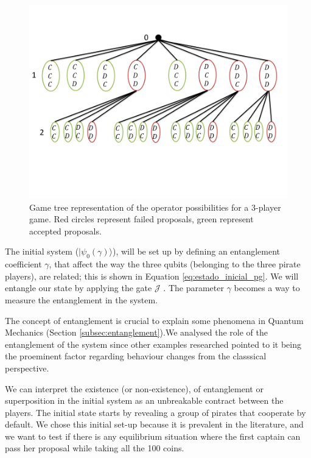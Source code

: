 \begin{figure}[h]
\centering 
\includegraphics[scale=0.55]{Figures/architecture/GameTree/Slide1.png}
\caption{Game tree representation of the operator possibilities for a $3$-player game. Red circles represent failed proposals, green represent accepted proposals. }
\label{fig:pg_architecturegametree}
\end{figure}

The initial system ($\vert \psi_{0}(\gamma) \rangle$), will be set up by defining an entanglement coefficient $\gamma$, that affect the way the three qubits (belonging to the three pirate players), are related; this is shown in Equation \ref{eq:estado_inicial_pg}. 
We will entangle our state by applying the gate $\mathcal{J}$ \cite{Letters2002}. The parameter $\gamma$ becomes a way to measure the entanglement in the system\cite{Eisert2008}. 

The concept of entanglement is crucial to explain some phenomena in Quantum Mechanics (Section \ref{subsec:entanglement}).We analysed the role of the entanglement of the system since other examples researched pointed to it being the proeminent factor regarding behaviour changes from the classsical perspective\cite{Fra2011a}\cite{Fra2011}\cite{Letters2002}\cite{Khan2011}\cite{Ricketts2006}. 

We can interpret the existence (or non-existence), of entanglement or superposition in the initial system as an unbreakable contract between the players\cite{Piotrowski}. The initial state starts by revealing a group of pirates that cooperate by default. We chose this initial set-up because it is prevalent in the literature, and we want to test if there is any equilibrium situation where the first captain can pass her proposal while taking all the 100 coins. 


